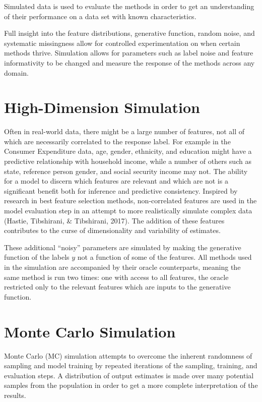 \documentclass[12pt,twoside]{reedthesis}
\begin{document}
Simulated data is used to evaluate the methods in order to get an
understanding of their performance on a data set with known
characteristics.

Full insight into the feature distributions, generative function, random
noise, and systematic missingness allow for controlled experimentation
on when certain methods thrive. Simulation allows for parameters such as
label noise and feature informativity to be changed and measure the
response of the methods across any domain.

\section{High-Dimension Simulation}\label{high-dimension-simulation}

Often in real-world data, there might be a large number of features, not
all of which are necessarily correlated to the response label. For
example in the Consumer Expenditure data, age, gender, ethnicity, and
education might have a predictive relationship with household income,
while a number of others such as state, reference person gender, and
social security income may not. The ability for a model to discern which
features are relevant and which are not is a significant benefit both
for inference and predictive consistency. Inspired by research in best
feature selection methods, non-correlated features are used in the model
evaluation step in an attempt to more realistically simulate complex
data (Hastie, Tibshirani, \& Tibshirani, 2017). The addition of these
features contributes to the curse of dimensionality and variability of
estimates.

These additional ``noisy'' parameters are simulated by making the
generative function of the labels \(y\) not a function of some of the
features. All methods used in the simulation are accompanied by their
oracle counterparts, meaning the same method is run two times: one with
access to all features, the oracle restricted only to the relevant
features which are inputs to the generative function.

\section{Monte Carlo Simulation}\label{monte-carlo-simulation}

Monte Carlo (MC) simulation attempts to overcome the inherent randomness
of sampling and model training by repeated iterations of the sampling,
training, and evaluation steps. A distribution of output estimates is
made over many potential samples from the population in order to get a
more complete interpretation of the results.
\end{document}
